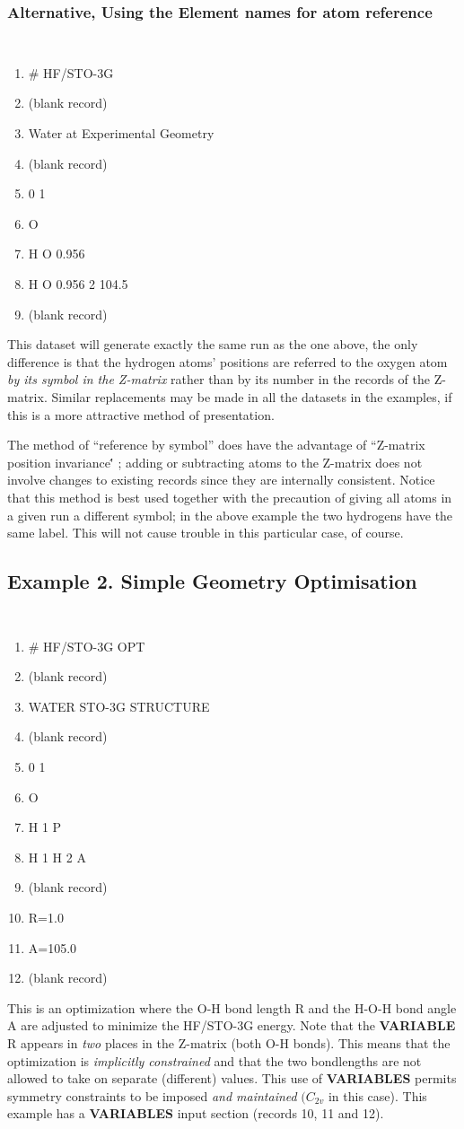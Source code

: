 \subsubsection{\sf Alternative, Using the Element names for atom reference}
{\tt 
\begin{enumerate}
\item \# HF/STO-3G
\item (blank record)
\item Water at Experimental Geometry
\item (blank record)
\item 0 1
\item O
\item H O 0.956
\item H O 0.956 2 104.5
\item (blank record)
\end{enumerate}
}
This dataset will generate exactly the same run as the one above,
the only difference is that the hydrogen atoms' positions are
referred to the oxygen atom {\em by its symbol in the Z-matrix}
rather than by its number in the records of the Z-matrix.
Similar replacements may be made in all the datasets in the examples,
if this is a more attractive method of presentation.

The method of ``reference by symbol'' does have the advantage
of ``Z-matrix position invariance\'' ; adding or subtracting atoms to
the Z-matrix does not involve changes to existing records since they
are internally consistent. Notice that this method is best used together
with the precaution of giving all atoms in a given run a different 
symbol; in the above
example the two hydrogens have the same label. This will not
cause trouble in this particular case, of course.
\newpage
\subsection{\sf Example 2. Simple Geometry Optimisation}
{\tt 
\begin{enumerate}
\item \# HF/STO-3G OPT
\item (blank record)
\item WATER STO-3G STRUCTURE
\item (blank record)
\item 0 1
\item O
\item H 1 P
\item H 1 H 2 A
\item (blank record)
\item R=1.0
\item A=105.0
\item (blank record)
\end{enumerate}
}
This is an optimization where the O-H bond length R and the H-O-H bond angle
A are adjusted to minimize the HF/STO-3G energy.  Note that the 
{\bf VARIABLE}
R appears in {\em two} places in the Z-matrix (both O-H bonds).  
This means that the optimization
is {\em implicitly constrained} and that the two bondlengths 
are not allowed to take on separate
(different) values.  This use of {\bf VARIABLES} 
permits symmetry constraints to
be imposed {\em and maintained}
$(C_{2v}$ in this case).  This example has a {\bf VARIABLES} input
section (records 10, 11 and 12).
\newpage
